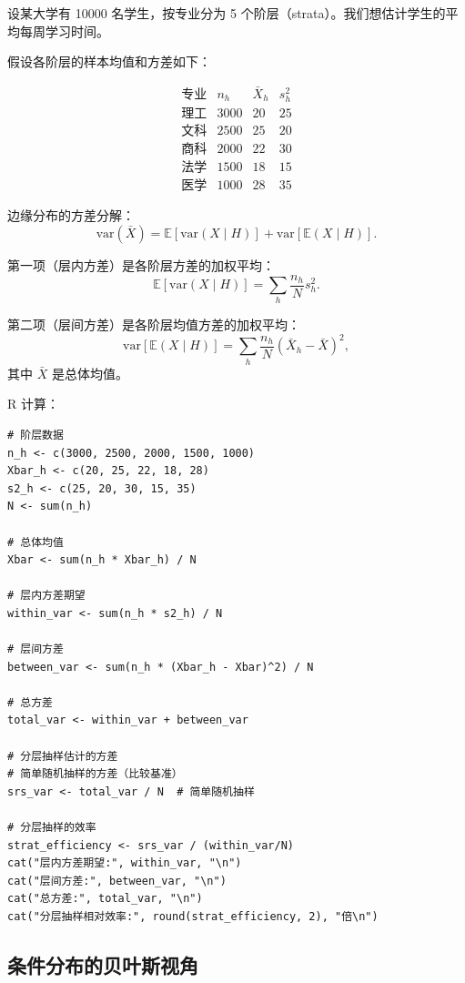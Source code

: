 \begin{example}[分层抽样的方差分解]\label{ex:stratified-sampling-variance-ch2}
设某大学有 10000 名学生，按专业分为 5 个阶层（strata）。我们想估计学生的平均每周学习时间。

假设各阶层的样本均值和方差如下：

\[
\begin{array}{c|c|c|c}
\text{专业} & n_h & \bar{X}_h & s_h^2 \\ \hline
\text{理工} & 3000 & 20 & 25 \\
\text{文科} & 2500 & 25 & 20 \\
\text{商科} & 2000 & 22 & 30 \\
\text{法学} & 1500 & 18 & 15 \\
\text{医学} & 1000 & 28 & 35
\end{array}
\]

边缘分布的方差分解：
\[
\text{var}(\bar{X}) = \mathbb{E}[\text{var}(X \mid H)] + \text{var}[\mathbb{E}(X \mid H)].
\]

第一项（层内方差）是各阶层方差的加权平均：
\[
\mathbb{E}[\text{var}(X \mid H)] = \sum_h \frac{n_h}{N} s_h^2.
\]

第二项（层间方差）是各阶层均值方差的加权平均：
\[
\text{var}[\mathbb{E}(X \mid H)] = \sum_h \frac{n_h}{N} (\bar{X}_h - \bar{X})^2,
\]
其中 $\bar{X}$ 是总体均值。

R 计算：
\begin{verbatim}
# 阶层数据
n_h <- c(3000, 2500, 2000, 1500, 1000)
Xbar_h <- c(20, 25, 22, 18, 28)
s2_h <- c(25, 20, 30, 15, 35)
N <- sum(n_h)

# 总体均值
Xbar <- sum(n_h * Xbar_h) / N

# 层内方差期望
within_var <- sum(n_h * s2_h) / N

# 层间方差
between_var <- sum(n_h * (Xbar_h - Xbar)^2) / N

# 总方差
total_var <- within_var + between_var

# 分层抽样估计的方差
# 简单随机抽样的方差（比较基准）
srs_var <- total_var / N  # 简单随机抽样

# 分层抽样的效率
strat_efficiency <- srs_var / (within_var/N)
cat("层内方差期望:", within_var, "\n")
cat("层间方差:", between_var, "\n")
cat("总方差:", total_var, "\n")
cat("分层抽样相对效率:", round(strat_efficiency, 2), "倍\n")
\end{verbatim}
\end{example}

\subsection{条件分布的贝叶斯视角}


